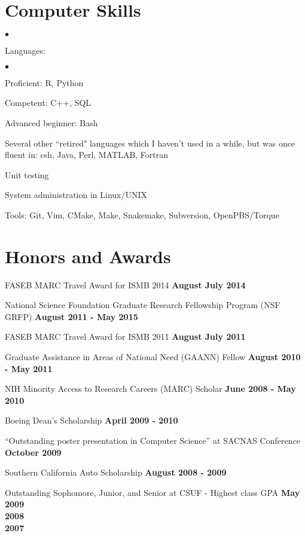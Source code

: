\documentclass[margin,line]{res}
\newenvironment{list2}{
  \begin{list}{$\bullet$}{%
      \setlength{\itemsep}{0in}
      \setlength{\parsep}{0in} \setlength{\parskip}{0in}
      \setlength{\topsep}{0in} \setlength{\partopsep}{0in}
      \setlength{\leftmargin}{0.2in}}}{\end{list}}
\begin{document}
\begin{resume}
\section{\sc Computer Skills}
\begin{list2}
\item Languages:
  \begin{list2}
    \item Proficient: R, Python
    \item Competent: C++, SQL
    \item Advanced beginner: Bash
  \end{list2}
\item Several other ``retired" languages which I haven't used in a while,
  but was once fluent in: csh, Java, Perl, MATLAB, Fortran
\item Unit testing
\item System administration in Linux/UNIX
\item Tools: Git, Vim, CMake, Make, Snakemake, Subversion, OpenPBS/Torque\\
\end{list2}
\vspace{-.65cm}

\section{\sc Honors and Awards}
FASEB MARC Travel Award for ISMB 2014 \hfill {\bf August
  July 2014}

National Science Foundation Graduate Research Fellowship Program (NSF GRFP)
\hfill {\bf August 2011 - May 2015}

FASEB MARC Travel Award for ISMB 2011 \hfill {\bf August
  July 2011}

Graduate Assistance in Areas of National Need (GAANN) Fellow \hfill {\bf August
  2010 - May 2011}

NIH Minority Access to Research Careers (MARC) Scholar \hfill {\bf
  June 2008 - May 2010}

Boeing Dean's Scholarship \hfill {\bf April 2009 - 2010}

``Outstanding poster presentation in Computer Science'' at SACNAS
Conference \hfill {\bf October 2009}

Southern California Auto Scholarship \hfill {\bf August 2008 - 2009}

\vspace*{1.5mm}
Outstanding Sophomore, Junior, and Senior at CSUF - Highest class GPA
\hfill {\bf May 2009}
\\
\hspace*{2cm} \hfill \textbf{2008} \\
\hspace*{2cm} \hfill \textbf{2007}


\end{resume}
\end{document}
